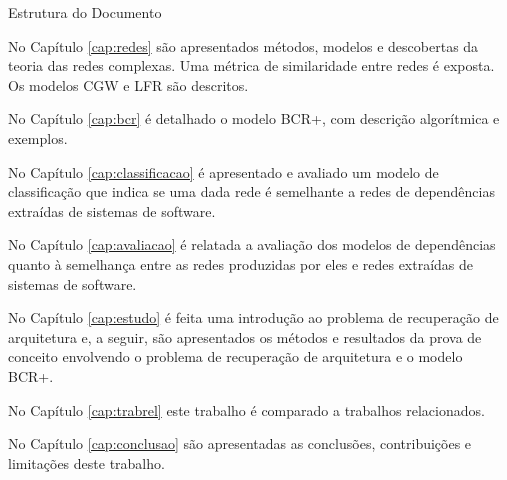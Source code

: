 \begin{section}{Estrutura do Documento}
	
	No Capítulo \ref{cap:redes} são apresentados métodos, modelos e descobertas da teoria das redes complexas. Uma métrica de similaridade entre redes é exposta. Os modelos CGW e LFR são descritos.
	
	No Capítulo \ref{cap:bcr} é detalhado o modelo BCR+, com descrição algorítmica e exemplos.
	
	No Capítulo \ref{cap:classificacao} é apresentado e avaliado um modelo de classificação que indica se uma dada rede é semelhante a redes de dependências extraídas de sistemas de software.
	
	No Capítulo \ref{cap:avaliacao} é relatada a avaliação dos modelos de dependências quanto à semelhança entre as redes produzidas por eles e redes extraídas de sistemas de software.
	
	No Capítulo \ref{cap:estudo} é feita uma introdução ao problema de recuperação de arquitetura e, a seguir, são apresentados os métodos e resultados da prova de conceito envolvendo o problema de recuperação de arquitetura e o modelo BCR+.
	
	No Capítulo \ref{cap:trabrel} este trabalho é comparado a trabalhos relacionados. 
	
	No Capítulo \ref{cap:conclusao} são apresentadas as conclusões, contribuições e limitações deste trabalho.
	
\end{section}
